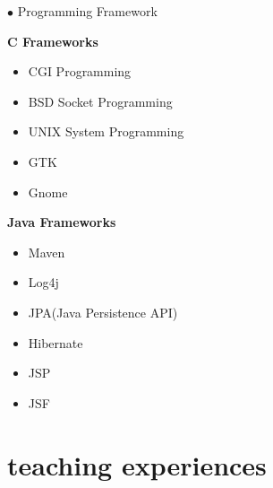 \documentclass[]{friggeri-cv} %
\begin{document}
\begin{entrylist}
	\entry
	{\textcolor{UniBlue}{$\bullet$}}
	{Programming Framework}
	{}
	{
		\textbf{C Frameworks}
		\begin{itemize}
			\item CGI Programming
			\item BSD Socket Programming
			\item UNIX System Programming
			\item GTK
			\item Gnome
		\end{itemize}

		\textbf{Java Frameworks}
		\begin{itemize}
			\item Maven
			\item Log4j
			\item JPA(Java Persistence API)
			\item Hibernate
			\item JSP
			\item JSF
		\end{itemize}
	}



\end{entrylist}


\section{teaching experiences}
\end{document}
